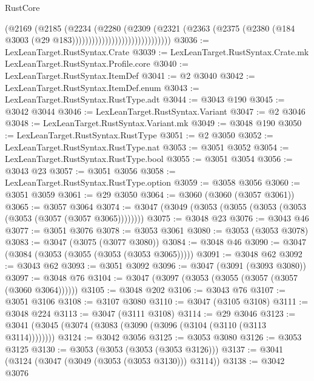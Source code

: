 \begin{lexlean}{RustCore}
\begin{coremodule}
                                          (@2169
                                            (@2185
                                              (@2234
                                                (@2280
                                                  (@2309
                                                    (@2321
                                                      (@2363
                                                        (@2375
                                                          (@2380
                                                            (@184
                                                              @3003
                                                              (@29
                                                                @183))))))))))))))))))))))))))))))
@3036 := LexLeanTarget.RustSyntax.Crate
@3039 := LexLeanTarget.RustSyntax.Crate.mk LexLeanTarget.RustSyntax.Profile.core
@3040 := LexLeanTarget.RustSyntax.ItemDef
@3041 := @2 @3040
@3042 := LexLeanTarget.RustSyntax.ItemDef.enum
@3043 := LexLeanTarget.RustSyntax.RustType.adt
@3044 := @3043 @190
@3045 := @3042 @3044
@3046 := LexLeanTarget.RustSyntax.Variant
@3047 := @2 @3046
@3048 := LexLeanTarget.RustSyntax.Variant.mk
@3049 := @3048 @190
@3050 := LexLeanTarget.RustSyntax.RustType
@3051 := @2 @3050
@3052 := LexLeanTarget.RustSyntax.RustType.nat
@3053 := @3051 @3052
@3054 := LexLeanTarget.RustSyntax.RustType.bool
@3055 := @3051 @3054
@3056 := @3043 @23
@3057 := @3051 @3056
@3058 := LexLeanTarget.RustSyntax.RustType.option
@3059 := @3058 @3056
@3060 := @3051 @3059
@3061 := @29 @3050
@3064 := @3060 (@3060 (@3057 @3061))
@3065 := @3057 @3064
@3074 := @3047 (@3049 (@3053 (@3055 (@3053 (@3053 (@3053 (@3057 (@3057 @3065))))))))
@3075 := @3048 @23
@3076 := @3043 @46
@3077 := @3051 @3076
@3078 := @3053 @3061
@3080 := @3053 (@3053 @3078)
@3083 := @3047 (@3075 (@3077 @3080))
@3084 := @3048 @46
@3090 := @3047 (@3084 (@3053 (@3055 (@3053 (@3053 @3065)))))
@3091 := @3048 @62
@3092 := @3043 @62
@3093 := @3051 @3092
@3096 := @3047 (@3091 (@3093 @3080))
@3097 := @3048 @76
@3104 := @3047 (@3097 (@3053 (@3055 (@3057 (@3057 (@3060 @3064))))))
@3105 := @3048 @202
@3106 := @3043 @76
@3107 := @3051 @3106
@3108 := @3107 @3080
@3110 := @3047 (@3105 @3108)
@3111 := @3048 @224
@3113 := @3047 (@3111 @3108)
@3114 := @29 @3046
@3123 := @3041 (@3045 (@3074 (@3083 (@3090 (@3096 (@3104 (@3110 (@3113 @3114))))))))
@3124 := @3042 @3056
@3125 := @3053 @3080
@3126 := @3053 @3125
@3130 := @3053 (@3053 (@3053 (@3053 @3126)))
@3137 := @3041 (@3124 (@3047 (@3049 (@3053 (@3053 @3130))) @3114))
@3138 := @3042 @3076

\end{coremodule}
\end{lexlean}

